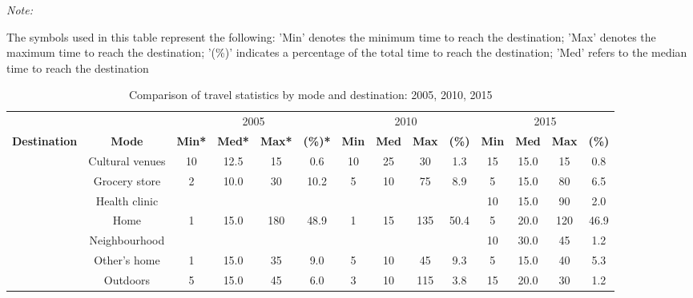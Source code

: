 \documentclass[Royal,times,sageh]{sagej}
\begin{document}
\begingroup\fontsize{6}{8}\selectfont

\begin{ThreePartTable}
\begin{TableNotes}
\item \textit{Note: } 
\item * The symbols used in this table represent the following: 'Min' denotes the minimum time to reach the destination; 'Max' denotes the maximum time to reach the destination; '(\%)' indicates a percentage of the total time to reach the destination; 'Med' refers to the median time to reach the destination
\end{TableNotes}
\begin{longtable}[t]{ccccc>{}c|ccc>{}c|cccc}
\caption{\label{tab:table-03}\label{tab:table-03}Comparison of travel statistics by mode and destination: 2005, 2010, 2015}\\
\toprule
\multicolumn{2}{c}{ } & \multicolumn{4}{c}{2005} & \multicolumn{4}{c}{2010} & \multicolumn{4}{c}{2015} \\
\cmidrule(l{3pt}r{3pt}){3-6} \cmidrule(l{3pt}r{3pt}){7-10} \cmidrule(l{3pt}r{3pt}){11-14}
\multicolumn{1}{c}{\textbf{Destination}} & \multicolumn{1}{c}{\textbf{Mode}} & \multicolumn{1}{c}{\textbf{Min*}} & \multicolumn{1}{c}{\textbf{Med*}} & \multicolumn{1}{c}{\textbf{Max*}} & \multicolumn{1}{c}{\textbf{(\%)*}} & \multicolumn{1}{c}{\textbf{Min}} & \multicolumn{1}{c}{\textbf{Med}} & \multicolumn{1}{c}{\textbf{Max}} & \multicolumn{1}{c}{\textbf{(\%)}} & \multicolumn{1}{c}{\textbf{Min}} & \multicolumn{1}{c}{\textbf{Med}} & \multicolumn{1}{c}{\textbf{Max}} & \multicolumn{1}{c}{\textbf{(\%)}}\\
\midrule
 & Cultural venues & 10 & 12.5 & 15 & 0.6 & 10 & 25 & 30 & 1.3 & 15 & 15.0 & 15 & 0.8\\
\nopagebreak
 & Grocery store & 2 & 10.0 & 30 & 10.2 & 5 & 10 & 75 & 8.9 & 5 & 15.0 & 80 & 6.5\\
\nopagebreak
 & Health clinic &  &  &  &  &  &  &  &  & 10 & 15.0 & 90 & 2.0\\
\nopagebreak
 & Home & 1 & 15.0 & 180 & 48.9 & 1 & 15 & 135 & 50.4 & 5 & 20.0 & 120 & 46.9\\
\nopagebreak
 & Neighbourhood &  &  &  &  &  &  &  &  & 10 & 30.0 & 45 & 1.2\\
\nopagebreak
 & Other's home & 1 & 15.0 & 35 & 9.0 & 5 & 10 & 45 & 9.3 & 5 & 15.0 & 40 & 5.3\\
\nopagebreak
 & Outdoors & 5 & 15.0 & 45 & 6.0 & 3 & 10 & 115 & 3.8 & 15 & 20.0 & 30 & 1.2\\

\end{longtable}
\end{ThreePartTable}
\end{document}
